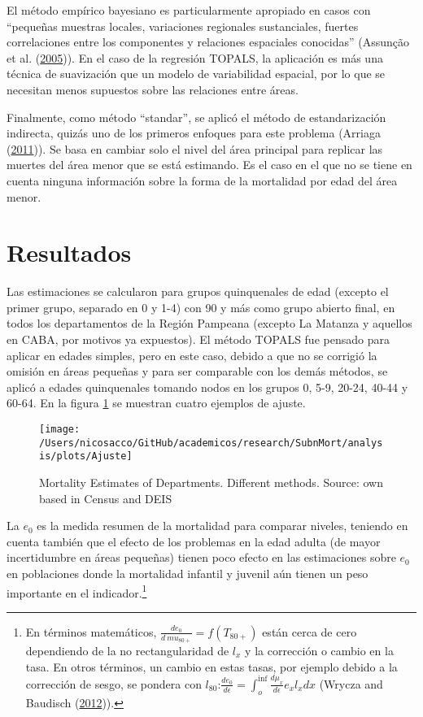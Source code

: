 \documentclass[12pt,]{article}
\begin{document}
El método empírico bayesiano es particularmente apropiado en casos con
``pequeñas muestras locales, variaciones regionales sustanciales,
fuertes correlaciones entre los componentes y relaciones espaciales
conocidas'' (Assunção et al.
(\protect\hyperlink{ref-Assuncao2005}{2005})). En el caso de la
regresión TOPALS, la aplicación es más una técnica de suavización que un
modelo de variabilidad espacial, por lo que se necesitan menos supuestos
sobre las relaciones entre áreas.

Finalmente, como método ``standar'', se aplicó el método de
estandarización indirecta, quizás uno de los primeros enfoques para este
problema (Arriaga (\protect\hyperlink{ref-Arriaga2011}{2011})). Se basa
en cambiar solo el nivel del área principal para replicar las muertes
del área menor que se está estimando. Es el caso en el que no se tiene
en cuenta ninguna información sobre la forma de la mortalidad por edad
del área menor.

\hypertarget{resultados}{%
\section{\texorpdfstring{\textbf{Resultados}}{Resultados}}\label{resultados}}

Las estimaciones se calcularon para grupos quinquenales de edad (excepto
el primer grupo, separado en 0 y 1-4) con 90 y más como grupo abierto
final, en todos los departamentos de la Región Pampeana (excepto La
Matanza y aquellos en CABA, por motivos ya expuestos). El método TOPALS
fue pensado para aplicar en edades simples, pero en este caso, debido a
que no se corrigió la omisión en áreas pequeñas y para ser comparable
con los demás métodos, se aplicó a edades quinquenales tomando nodos en
los grupos 0, 5-9, 20-24, 40-44 y 60-64. En la figura \ref{fig:Ajuste}
se muestran cuatro ejemplos de ajuste.

\begin{figure}

{\centering \texttt{[image: /Users/nicosacco/GitHub/academicos/research/SubnMort/analysis/plots/Ajuste]} 

}

\caption{Mortality Estimates of Departments. Different methods. Source: own based in Census and DEIS}\label{fig:Ajuste}
\end{figure}

La \(e_0\) es la medida resumen de la mortalidad para comparar niveles,
teniendo en cuenta también que el efecto de los problemas en la edad
adulta (de mayor incertidumbre en áreas pequeñas) tienen poco efecto en
las estimaciones sobre \(e_0\) en poblaciones donde la mortalidad
infantil y juvenil aún tienen un peso importante en el
indicador.\footnote{En términos matemáticos,
  \(\frac{de_0} {d \ mu_ {80 +}} = f (T_ {80 +})\) están cerca de cero
  dependiendo de la no rectangularidad de \(l_x\) y la corrección o
  cambio en la tasa. En otros términos, un cambio en estas tasas, por
  ejemplo debido a la corrección de sesgo, se pondera con
  \(l_{80}\):\(\frac{de_0} {d \epsilon} = \int_{o}^{\inf}{\frac{d\mu_x} {d \epsilon} e_x l_x dx}\)
  (Wrycza and Baudisch (\protect\hyperlink{ref-Wrycza2012}{2012})).}
\end{document}

